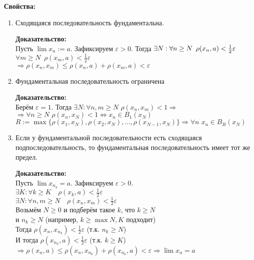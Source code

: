 \documentclass[12pt,letterpaper]{report}
\begin{document}
\textbf{Свойства:}
\begin{enumerate}
    \item Сходящаяся последовательность фундаментальна.
    
    \textbf{Доказательство:}\\
    Пусть $\lim x_n := a$. Зафиксируем $\varepsilon > 0$.
    Тогда $\exists N :\\ \forall n \geq N \,\,\, \rho(x_n, a) < 
    \frac{1}{2} \varepsilon$\\ 
    $\forall m \geq N \,\,\, \rho(x_m, a) < \frac{1}{2} \varepsilon$\\
    $\Rightarrow \rho(x_n, x_m) \leq \rho(x_n, a) + \rho(x_m, a) <
    \varepsilon$

    \item Фундаментальная последовательность ограничена
    
    \textbf{Доказательство:}\\
    Берём $\varepsilon = 1$. Тогда $\exists N : \forall n, m \geq N \,\,
    \rho(x_n, x_m) < 1 \Rightarrow$\\
    $\Rightarrow \forall n \geq N \,\, \rho(x_n, x_N) < 1
    \Leftrightarrow x_n \in B_1(x_N)$\\
    $R := \max\{\rho(x_1, x_N), \rho(x_2, x_N), \dots, 
    \rho(x_{N-1}, x_N)\} \Rightarrow \forall n \,\, x_n \in B_R(x_N)$

    \item Если у фундаментальной последовательности есть сходящаяся
    подпоследовательность, то фундаментальная последовательность
    имеет тот же предел.

    \textbf{Доказательство:}\\
    Пусть $\lim x_{n_k} = a$. Зафиксируем $\varepsilon > 0$.\\
    $\exists K : \forall k \geq K \quad \rho(x_k, a) <
    \frac{1}{2} \varepsilon$\\
    $\exists N : \forall n, m \geq N \quad \rho(x_n, x_m) <
    \frac{1}{2} \varepsilon$\\
    Возьмём $N \geq 0$ и подберём такое $k$, что $k \geq N$\\
    и $n_k \geq N$ (например, $k \geq \max{N, K}$ подходит)\\
    Тогда $\rho(x_n, x_{n_k}) < \frac{1}{2} \varepsilon$
    (т.к. $n_k \geq N$)\\
    И тогда $\rho(x_{n_k}, a) < \frac{1}{2} \varepsilon$
    (т.к. $k \geq K$)\\
    $\Rightarrow \rho(x_n, a) \leq \rho(x_n, x_{n_k}) +
    \rho(x_{n_k}, a) < \varepsilon \Rightarrow \lim x_n = a$
\end{enumerate}
\end{document}
